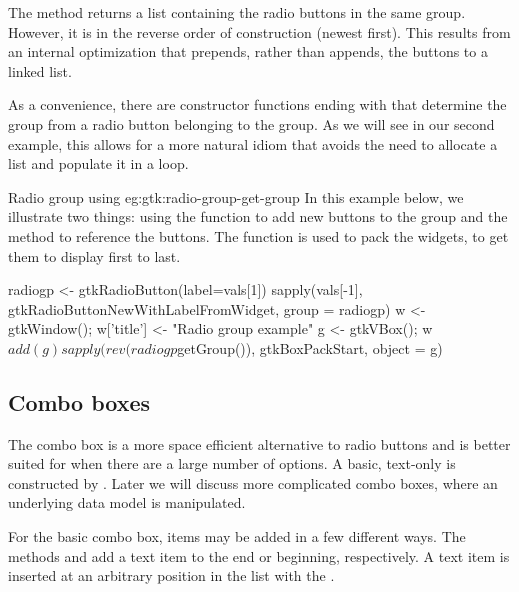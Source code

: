 The  method returns a list containing
the radio buttons in the same group. However, it is in the reverse
order of construction (newest first). This results from an internal
optimization that prepends, rather than appends, the buttons to a
linked list.

As a convenience, there are constructor functions ending with
 that determine the group from a radio button
belonging to the group. As we will see in our second example, this
allows for a more natural  idiom that avoids the need
to allocate a list and populate it in a  loop.

\begin{example}{Radio group using }{eg:gtk:radio-group-get-group}
  In this example below, we illustrate two things: using the
   function to add new
  buttons to the group and the 
  method to reference the buttons. The  function is used
  to pack the widgets, to get them to display first to last.
\begin{Schunk}
\begin{Sinput}
 radiogp <- gtkRadioButton(label=vals[1])
 sapply(vals[-1], gtkRadioButtonNewWithLabelFromWidget, group = radiogp)
 w <- gtkWindow(); 
 w['title'] <- "Radio group example"
 g <- gtkVBox(); w$add(g)
 sapply(rev(radiogp$getGroup()), gtkBoxPackStart, object = g)
\end{Sinput}
\end{Schunk}
\end{example}



\subsection{Combo boxes}
\label{sec:RGtk2:basic-combobox}

The combo box is a more space efficient alternative to radio buttons
and is better suited for when there are a large number of options. A
basic, text-only  is constructed by
. Later we will discuss more
complicated combo boxes, where an underlying data model is
manipulated.

For the basic combo box, items may be added in a few different ways.
The methods  and
 add a text item to the end or
beginning, respectively.  A text item is inserted at an arbitrary
position in the list with the .


